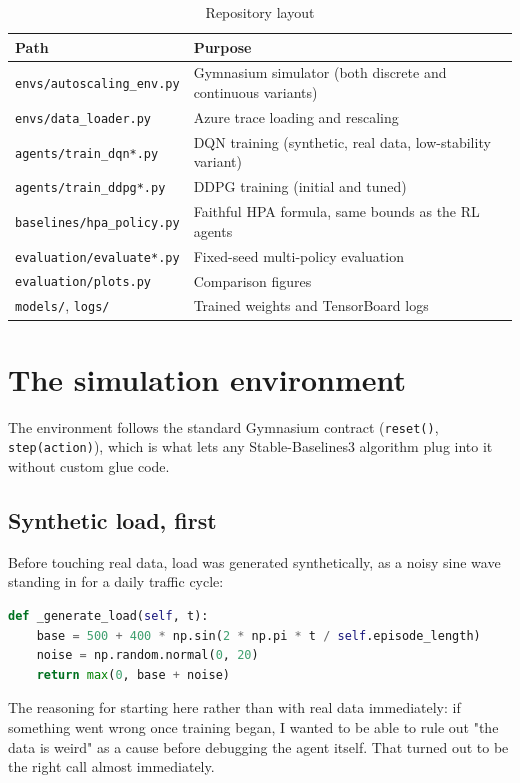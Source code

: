 \documentclass{rapportINPTCLOUD}
\begin{document}
\begin{table}[h]
\centering
\begin{tabularx}{\textwidth}{lX}
\toprule
\textbf{Path} & \textbf{Purpose} \\
\midrule
\texttt{envs/autoscaling\_env.py} & Gymnasium simulator (both discrete and continuous variants) \\
\texttt{envs/data\_loader.py} & Azure trace loading and rescaling \\
\texttt{agents/train\_dqn*.py} & DQN training (synthetic, real data, low-stability variant) \\
\texttt{agents/train\_ddpg*.py} & DDPG training (initial and tuned) \\
\texttt{baselines/hpa\_policy.py} & Faithful HPA formula, same bounds as the RL agents \\
\texttt{evaluation/evaluate*.py} & Fixed-seed multi-policy evaluation \\
\texttt{evaluation/plots.py} & Comparison figures \\
\texttt{models/}, \texttt{logs/} & Trained weights and TensorBoard logs \\
\bottomrule
\end{tabularx}
\caption{Repository layout}
\end{table}

\section{The simulation environment}

The environment follows the standard Gymnasium contract (\texttt{reset()}, \texttt{step(action)}), which is what lets any Stable-Baselines3 algorithm plug into it without custom glue code.

\subsection{Synthetic load, first}

Before touching real data, load was generated synthetically, as a noisy sine wave standing in for a daily traffic cycle:
\begin{lstlisting}[language=Python]
def _generate_load(self, t):
    base = 500 + 400 * np.sin(2 * np.pi * t / self.episode_length)
    noise = np.random.normal(0, 20)
    return max(0, base + noise)
\end{lstlisting}
The reasoning for starting here rather than with real data immediately: if something went wrong once training began, I wanted to be able to rule out "the data is weird" as a cause before debugging the agent itself. That turned out to be the right call almost immediately.
\end{document}
